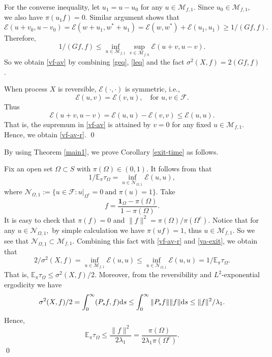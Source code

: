 \documentclass[12pt,reqno]{article}
\theoremstyle{definition}
\theoremstyle{remark}
\theoremstyle{example}
\numberwithin{equation}{section}
\newcommand{\scr}[1]{\mathscr #1}
\def\d{\mathrm{d}}
\def\e{\scr E}
\def\cM{\mathcal M}
\def\cN{\mathcal N}
\def\bE{\mathbb E}
\def\d{\rm d}
\def\bg{\begin}
\def\be{\bg{equation}}
\def\de{\end{equation}}
\def\lb{\label}
\def\d{{\mbox{\rm d}}}
\begin{document}
{For the converse inequality,  let $u_1=u-u_0$ for any $u\in\scr{M}_{f,1}$. Since $u_0\in\scr{M}_{f,1}$, we also have $\pi(u_1f)=0$. Similar  argument shows that
$$
\e(u+v_0,u-v_0)=\e(w+u_1,w^*+u_1)=\e(w,w^*)+\e(u_1,u_1)\geq 1/( Gf,f).
$$
Therefore,
\be\lb{leq}
1/(Gf,f)\leq\inf_{u\in\scr{M}_{f,1}}\sup_{v\in\scr{M}_{f,0}}\e(u+v,u-v).
\de
So we obtain \eqref{vf-av} by combining \eqref{geq}, \eqref{leq} and the fact $\sigma^2(X,f)=2(Gf,f)$.

When process $X$ is reversible,  $\e(\cdot,\cdot)$ is symmetric, i.e.,
$$
\e(u,v)=\e(v,u),\quad \text{for }u,v\in\scr{F}.
$$
Thus %
$$
\e(u+v,u-v)=\e(u,u)-\e(v,v)\leq \e(u,u).
$$
That is, the supremum in \eqref{vf-av} is attained by $v=0$ for any fixed $u\in\scr{M}_{f,1}$. Hence, we obtain \eqref{vf-av-r}.
\qed

By using Theorem \ref{main1}, we prove Corollary \ref{exit-time} as follows.


\medskip
{}
Fix an open set $\Omega\subset S$ with $\pi(\Omega)\in (0,1)$. It follows from \cite[Theorem 3.3]{HKMW20} that
\be\label{va-exit}
1/\bE_\pi\tau_\Omega=\inf_{u\in \cN_{\Omega,1}}\e(u,u),
\de
where 	$
\cN_{\Omega,1}:=\{u\in\mathscr{F}:u|_{\Omega^c}=0\ \text{and }\pi(u)=1\}.
$
Take $$f=\frac{\mathbf{1}_\Omega-\pi(\Omega)}{1-\pi(\Omega)}.$$
It is easy to check that
$\pi(f)=0$ and $\|f\|^2=\pi(\Omega)/\pi(\Omega^c).$
Notice that for any $u\in \cN_{\Omega,1},$ by simple calculation we have
$\pi(uf)=1$, thus $u\in \cM_{f,1}$. So we see that $\cN_{\Omega,1}\subset \cM_{f,1}$.
Combining this fact with \eqref{vf-av-r} and \eqref{va-exit}, we obtain that
$$2/\sigma^2(X,f)=\inf_{u\in\scr{M}_{f,1}}\e(u,u)\leq \inf_{u\in \cN_{\Omega,1}}\e(u,u)=1/\bE_\pi\tau_\Omega.$$
That is, $\bE_\pi\tau_\Omega\leq \sigma^2(X,f)/2.$
Moreover, from the reversibility and $L^2$-exponential ergodicity we have
$$
\sigma^2(X,f)/2=\int_0^\infty (P_sf,f)\d s\leq \int_0^\infty \|P_sf\|\|f\|\d s\leq \|f\|^2/\lambda_1.
$$
Hence,
$$
\bE_\pi\tau_\Omega\leq \frac{\|f\|^2}{2\lambda_1}=\frac{\pi(\Omega)}{2\lambda_1\pi(\Omega^c)}.
$$
\qed
















}
\end{document}
